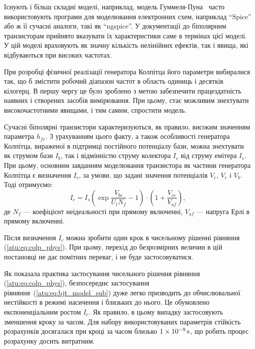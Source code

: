 Існують і більш складні моделі, наприклад, модель
Гуммеля-Пуна~\cite{gummel_poon_1970,shiskin_electronnie_pribori} часто використовують
програми для моделювання електронних схем, наприклад ``Spice'' або ж її сучасні аналоги,
такі як ``ngspice''. У документації до
біполярним транзисторам прийнято вказувати їх характеристики
саме в термінах цієї моделі. У цій моделі враховують як значну
кількість нелінійних ефектів, так і явища, які відбуваються
при високих частотах.

При розробці фізичної реалізації генератора Колпітца його
параметри вибиралися так, що б змістити робочий діапазон
частот в область одиниць і десятків кілогерц. В першу чергу
це було зроблено з метою забезпечити працездатність наявних
і створених засобів вимірювання. При цьому, стає можливим
знехтувати високочастотними явищами, і тим самим, спростити
модель.

Сучасні біполярні транзистори характеризуються, як
правило, високим значенням параметра
$h_{fe}$. З урахуванням цього факту, а також особливості генератора
Колпітца, вираженої в підтримці постійного потенціалу бази,
можна знехтувати як струмом бази
$I_b$, так і відмінністю струму колектора
$I_c$ від струму емітера
$I_e$. При цьому, основним завданням моделювання транзистора як
частини генератора Колпітца є визначення
$ I_c $, за умови, що задані значення потенціалів
$ V_e $,
$ V_c $ і
$ V_b $. Тоді отримуємо:
%
\begin{equation}
  I_c
  = I_s \left( \exp\frac{V_{be}}{U_t N_f} - 1 \right)
    \cdot
    \left( 1 + \frac{V_{ce}}{V_{af}}\right),
  \label{atu:eq:bjt_model_sub}
\end{equation}
%
де
$N_f$ --- коефіцієнт неідеальності при прямому включенні,
$ V_{af} $ --- напруга Ерлі в прямому включенні.

Після визначення
$ I_c $ можна зробити один крок в чисельному рішенні рівняння
(\ref{atu:eq:colp_phys}). При цьому, перехід до безрозмірних величин в цій
постановці не дає помітних переваг, і не буде застосовуватися.

Як показала практика застосування чисельного рішення рівняння
(\ref{atu:eq:colp_phys}), безпосереднє застосування рівняння~(\ref{atu:eq:bjt_model_sub})
дуже легко призводить до обчислювальної нестійкості в режимі
насичення і близьких до нього. Це обумовлено експоненціальним ростом
$ I_c $. Як правило, в цьому випадку застосовують зменшення кроку
за часом. Для набору використовуваних параметрів стійкість
розрахунків досягалася при кроці за часом близько
$ \SI{1E-9}{\second} $, що робить процес розрахунку досить витратним.

